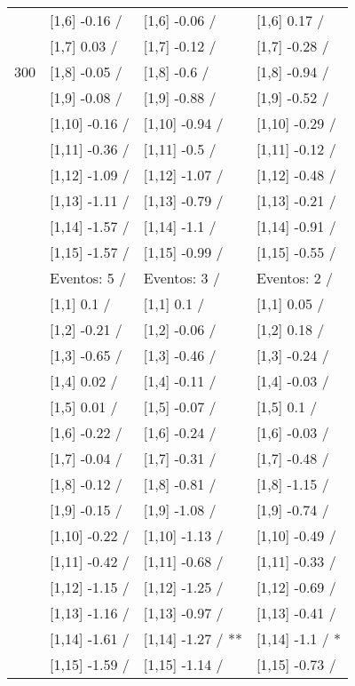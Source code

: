 \begin{table}
\begin{tabular}[t]{llll}
 & {}[1,6] -0.16  / & {}[1,6] -0.06  / & {}[1,6] 0.17  /\\
 & {}[1,7] 0.03  / & {}[1,7] -0.12  / & {}[1,7] -0.28  /\\
300 & {}[1,8] -0.05  / & {}[1,8] -0.6  / & {}[1,8] -0.94  /\\
\addlinespace
 & {}[1,9] -0.08  / & {}[1,9] -0.88  / & {}[1,9] -0.52  /\\
 & {}[1,10] -0.16  / & {}[1,10] -0.94  / & {}[1,10] -0.29  /\\
 & {}[1,11] -0.36  / & {}[1,11] -0.5  / & {}[1,11] -0.12  /\\
 & {}[1,12] -1.09  / & {}[1,12] -1.07  / & {}[1,12] -0.48  /\\
 & {}[1,13] -1.11  / & {}[1,13] -0.79  / & {}[1,13] -0.21  /\\
\addlinespace
 & {}[1,14] -1.57  / & {}[1,14] -1.1  / & {}[1,14] -0.91  /\\
 & {}[1,15] -1.57  / & {}[1,15] -0.99  / & {}[1,15] -0.55  /\\
 & Eventos:  5 / & Eventos:  3 / & Eventos:  2 /\\
 & {}[1,1] 0.1  / & {}[1,1] 0.1  / & {}[1,1] 0.05  /\\
 & {}[1,2] -0.21  / & {}[1,2] -0.06  / & {}[1,2] 0.18  /\\
\addlinespace
 & {}[1,3] -0.65  / & {}[1,3] -0.46  / & {}[1,3] -0.24  /\\
 & {}[1,4] 0.02  / & {}[1,4] -0.11  / & {}[1,4] -0.03  /\\
 & {}[1,5] 0.01  / & {}[1,5] -0.07  / & {}[1,5] 0.1  /\\
 & {}[1,6] -0.22  / & {}[1,6] -0.24  / & {}[1,6] -0.03  /\\
 & {}[1,7] -0.04  / & {}[1,7] -0.31  / & {}[1,7] -0.48  /\\
\addlinespace
500 & {}[1,8] -0.12  / & {}[1,8] -0.81  / & {}[1,8] -1.15  /\\
 & {}[1,9] -0.15  / & {}[1,9] -1.08  / & {}[1,9] -0.74  /\\
 & {}[1,10] -0.22  / & {}[1,10] -1.13  / & {}[1,10] -0.49  /\\
 & {}[1,11] -0.42  / & {}[1,11] -0.68  / & {}[1,11] -0.33  /\\
 & {}[1,12] -1.15  / & {}[1,12] -1.25  / & {}[1,12] -0.69  /\\
\addlinespace
 & {}[1,13] -1.16  / & {}[1,13] -0.97  / & {}[1,13] -0.41  /\\
 & {}[1,14] -1.61  / & {}[1,14] -1.27  / ** & {}[1,14] -1.1  / *\\
 & {}[1,15] -1.59  / & {}[1,15] -1.14  / & {}[1,15] -0.73  /\\
\bottomrule
\end{tabular}
\end{table}
